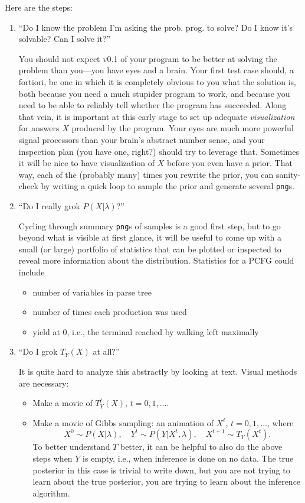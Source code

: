 \documentclass[11pt]{article}
\begin{document}
Here are the steps:
\begin{enumerate}
  \item ``Do I know the problem I'm asking the prob. prog. to solve?  Do I know
    it's solvable?  Can I solve it?''

    You should not expect v0.1 of your program to be better at solving the
    problem than you---you have eyes and a brain.  Your first test case should,
    a fortiori, be one in which it is completely obvious to you what the
    solution is, both because you need a much stupider program to work, and
    because you need to be able to reliably tell whether the program has
    succeeded.  Along that vein, it is important at this early stage to set up
    adequate {\em visualization} for answers $X$ produced by the program.  Your
    eyes are much more powerful signal processors than your brain's abstract
    number sense, and your inspection plan (you have one, right?) should try to
    leverage that.  Sometimes it will be nice to have visualization of $X$
    before you even have a prior.  That way, each of the (probably many) times
    you rewrite the prior, you can sanity-check by writing a quick loop to
    sample the prior and generate several \texttt{png}s.

  \item ``Do I really grok $P(X|\lambda)$?''

    Cycling through summary \texttt{png}s of samples is a good first step, but
    to go beyond what is visible at first glance, it will be useful to come up
    with a small (or large) portfolio of statistics that can be plotted or
    inspected to reveal more information about the distribution.  Statistics for
    a PCFG could include
    \begin{itemize}[noitemsep]
      \item number of variables in parse tree
      \item number of times each production was used
      \item yield at 0, i.e., the terminal reached by walking left maximally
    \end{itemize}

  \item\label{itm:grok-transition-operator}
    ``Do I grok $T_Y(X)$ at all?''

    It is quite hard to analyze this abstractly by looking at text.  Visual
    methods are necessary:
    \begin{itemize}[noitemsep]
      \item Make a movie of $T_Y^t(X)$, $t=0,1,\ldots$.
      \item Make a movie of Gibbs sampling: an animation of $X^t$, $t=0,1,\ldots$, where
        \[
        X^0 \sim P(X|\lambda), \quad
        Y^t \sim P(Y|X^t,\lambda), \quad
        X^{t+1} \sim T_Y(X^t).
        \]
        To better understand $T$ better, it can be helpful to also do the above
        steps when $Y$ is empty, i.e., when inference is done on no data.  The
        true posterior in this case is trivial to write down, but you are not
        trying to learn about the true posterior, you are trying to learn about
        the inference algorithm.
    \end{itemize}


\end{enumerate}
\end{document}
